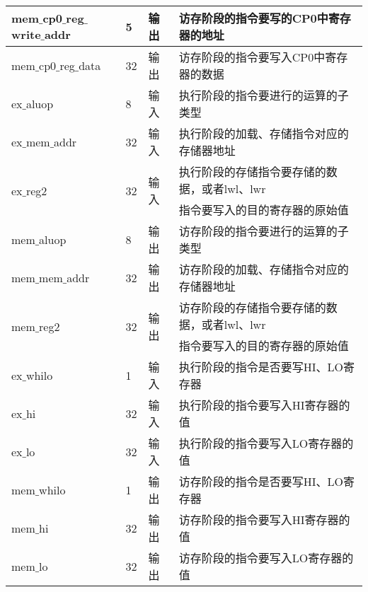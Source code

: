 \begin{table}[H]
\begin{tabular}{|l|l|l|l|}
		\hline
		mem$\_$cp0$\_$reg$\_$write$\_$addr & 5 & 输出 & 访存阶段的指令要写的CP0中寄存器的地址 \\
		\hline
		mem$\_$cp0$\_$reg$\_$data & 32 & 输出 & 访存阶段的指令要写入CP0中寄存器的数据 \\
		\hline
		ex$\_$aluop & 8 & 输入 & 执行阶段的指令要进行的运算的子类型 \\
		\hline
		ex$\_$mem$\_$addr & 32 & 输入 & 执行阶段的加载、存储指令对应的存储器地址 \\
		\hline
		\multirow{2}{*}{ex$\_$reg2} & \multirow{2}{*}{32} & \multirow{2}{*}{输入} & 执行阶段的存储指令要存储的数据，或者lwl、lwr \\
		& & & 指令要写入的目的寄存器的原始值 \\
		\hline
		mem$\_$aluop & 8 & 输出 & 访存阶段的指令要进行的运算的子类型 \\
		\hline
		mem$\_$mem$\_$addr & 32 & 输出 & 访存阶段的加载、存储指令对应的存储器地址 \\
		\hline
		\multirow{2}{*}{mem$\_$reg2} & \multirow{2}{*}{32} & \multirow{2}{*}{输出} & 访存阶段的存储指令要存储的数据，或者lwl、lwr \\
		& & & 指令要写入的目的寄存器的原始值 \\
		\hline
		ex$\_$whilo & 1 & 输入 & 执行阶段的指令是否要写HI、LO寄存器 \\
		\hline
		ex$\_$hi & 32 & 输入 & 执行阶段的指令要写入HI寄存器的值 \\
		\hline
		ex$\_$lo & 32 & 输入 & 执行阶段的指令要写入LO寄存器的值 \\
		\hline
		mem$\_$whilo & 1 & 输出 & 访存阶段的指令是否要写HI、LO寄存器 \\
		\hline
		mem$\_$hi & 32 & 输出 & 访存阶段的指令要写入HI寄存器的值 \\
		\hline
		mem$\_$lo & 32 & 输出 & 访存阶段的指令要写入LO寄存器的值 \\
		\hline
	\end{tabular}
\end{table}
